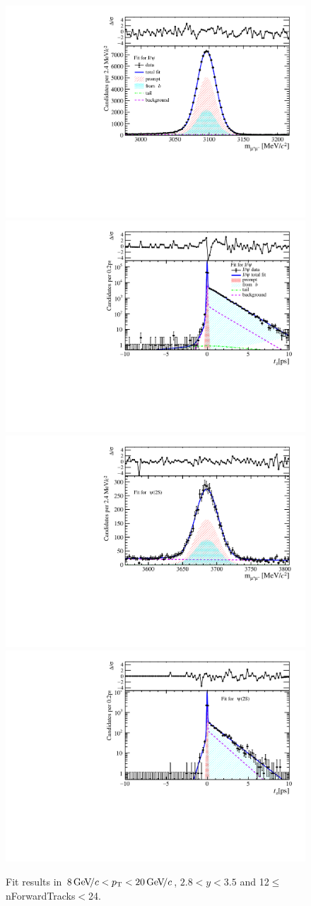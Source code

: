 \begin{figure}[H]
\begin{center}
\includegraphics[width=0.47\linewidth]{pdf/Jpsi/drawmassF/n2y2pt5.pdf}
\includegraphics[width=0.47\linewidth]{pdf/Jpsi/2DFitF/n2y2pt5.pdf}
\vspace*{-0.5cm}
\includegraphics[width=0.47\linewidth]{pdf/Psi2S/drawmassF/n2y2pt5.pdf}
\includegraphics[width=0.47\linewidth]{pdf/Psi2S/2DFitF/n2y2pt5.pdf}
\vspace*{-0.5cm}
\end{center}
\caption{Fit results in $8\text{\,Ge\kern -0.1em V\!/}c<p_{\mathrm{T}}<20\text{\,Ge\kern -0.1em V\!/}c$, $2.8<y<3.5$ and 12$\leq$nForwardTracks$<$24.}
\label{Fitn2y2pt5}
\end{figure}

